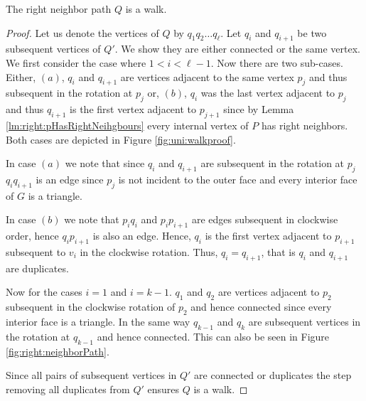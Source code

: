     \begin{lemma}
      \label{lm:right:neighborWalk}
      The right neighbor path $Q$ is a walk.
    \end{lemma}
    \begin{proof}
      Let us denote the vertices of $Q$ by $q_1 q_2 \ldots q_\ell$.
      Let $q_i$ and $q_{i+1}$ be two subsequent vertices of $Q'$. We show they are either connected or the same vertex. We first consider the case where $1 < i < \ell-1$.
      Now there are two sub-cases. Either, $(a)$, $q_i$ and $ q_{i+1}$ are vertices adjacent to the same vertex $p_j$ and thus subsequent in the rotation at $p_j$ or, $(b)$, $q_i$ was the last vertex adjacent to $p_j$ and thus $q_{i+1}$ is the first vertex adjacent to $p_{j+1}$ since by Lemma \ref{lm:right:pHasRightNeihgbours} every internal vertex of $P$ has right neighbors.
      Both cases are depicted in Figure \ref{fig:uni:walkproof}.

      In case $(a)$ we note that since $q_i$ and $q_{i+1}$ are subsequent in the rotation at $p_j$ $q_i q_{i+1}$ is an edge since $p_j$ is not incident to the outer face and every interior face of $G$ is a triangle.

      In case $(b)$ we note that $p_i q_i$ and $p_i p_{i+1}$ are edges subsequent in clockwise order, hence $q_{i} p_{i+1}$ is also an edge. Hence, $q_i$ is the first vertex adjacent to $p_{i+1}$ subsequent to $v_i$ in the clockwise rotation. Thus, $q_{i} = q_{i+1}$, that is $q_i$ and $q_{i+1}$ are duplicates.

      Now for the cases $i=1$ and $i=k-1$. $q_1$ and $q_2$ are vertices adjacent to $p_{2}$ subsequent in the clockwise rotation of ${p_2}$ and hence connected since every interior face is a triangle. In the same way $q_{k-1}$ and $q_k$ are subsequent vertices in the rotation at $q_{k-1}$ and hence connected. This can also be seen in Figure \ref{fig:right:neighborPath}.

      Since all pairs of subsequent vertices in $Q'$ are connected or duplicates the step removing all duplicates from $Q'$ ensures $Q$ is a walk.


\end{proof}
